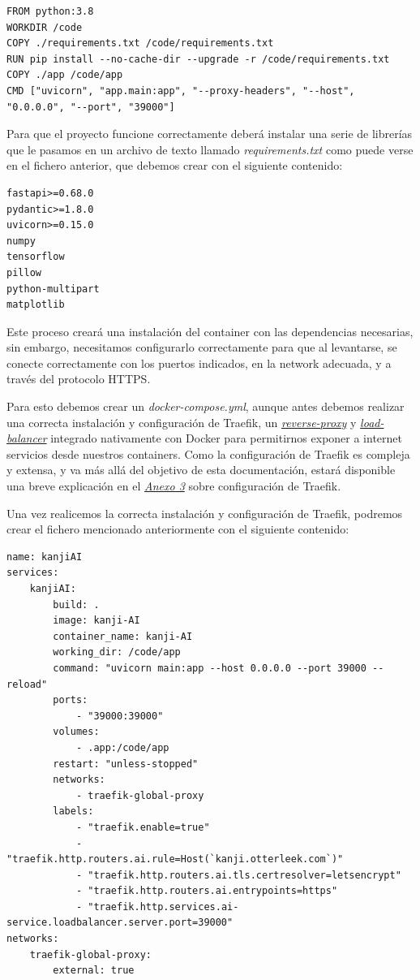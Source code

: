 \documentclass{article}
\begin{document}
\noindent\begin{minipage}{\textwidth}
\begin{lstlisting}[numbers=none]
FROM python:3.8
WORKDIR /code
COPY ./requirements.txt /code/requirements.txt
RUN pip install --no-cache-dir --upgrade -r /code/requirements.txt
COPY ./app /code/app
CMD ["uvicorn", "app.main:app", "--proxy-headers", "--host", "0.0.0.0", "--port", "39000"]
\end{lstlisting}
\end{minipage}
Para que el proyecto funcione correctamente deberá instalar una serie de librerías que le pasamos en un archivo de texto llamado \textit{requirements.txt} como puede verse en el fichero anterior, que debemos crear con el siguiente contenido:

\noindent\begin{minipage}{\textwidth}
\begin{lstlisting}[numbers=none]
fastapi>=0.68.0
pydantic>=1.8.0
uvicorn>=0.15.0
numpy
tensorflow
pillow
python-multipart
matplotlib
\end{lstlisting}
\end{minipage}

Este proceso creará una instalación del container con las dependencias necesarias, sin embargo, necesitamos configurarlo correctamente para que al levantarse, se conecte correctamente con los puertos indicados, en la network adecuada, y a través del protocolo HTTPS.

Para esto debemos crear un \textit{docker-compose.yml}, aunque antes debemos realizar una correcta instalación y configuración de Traefik, un \hyperref[sec:terms]{\textit{reverse-proxy}\tec} y \hyperref[sec:terms]{\textit{load-balancer}\tec} integrado nativamente con Docker para permitirnos exponer a internet servicios desde nuestros containers. Como la configuración de Traefik es compleja y extensa, y va más allá del objetivo de esta documentación, estará disponible una breve explicación en el \hyperref[sec:Traefik]{\textit{Anexo 3}} sobre configuración de Traefik.

Una vez realicemos la correcta instalación y configuración de Traefik, podremos crear el fichero mencionado anteriormente con el siguiente contenido:

\noindent\begin{minipage}{\textwidth}
\begin{lstlisting}[numbers=none]
name: kanjiAI
services:
	kanjiAI:
    	build: .
    	image: kanji-AI
    	container_name: kanji-AI
    	working_dir: /code/app
    	command: "uvicorn main:app --host 0.0.0.0 --port 39000 --reload"
    	ports:
        	- "39000:39000"
    	volumes:
        	- .app:/code/app
    	restart: "unless-stopped"
    	networks:
        	- traefik-global-proxy
    	labels:
        	- "traefik.enable=true"
        	- "traefik.http.routers.ai.rule=Host(`kanji.otterleek.com`)"
        	- "traefik.http.routers.ai.tls.certresolver=letsencrypt"
        	- "traefik.http.routers.ai.entrypoints=https"
        	- "traefik.http.services.ai-service.loadbalancer.server.port=39000"
networks:
	traefik-global-proxy:
    	external: true
   	 
\end{lstlisting}
\end{minipage}
\end{document}
